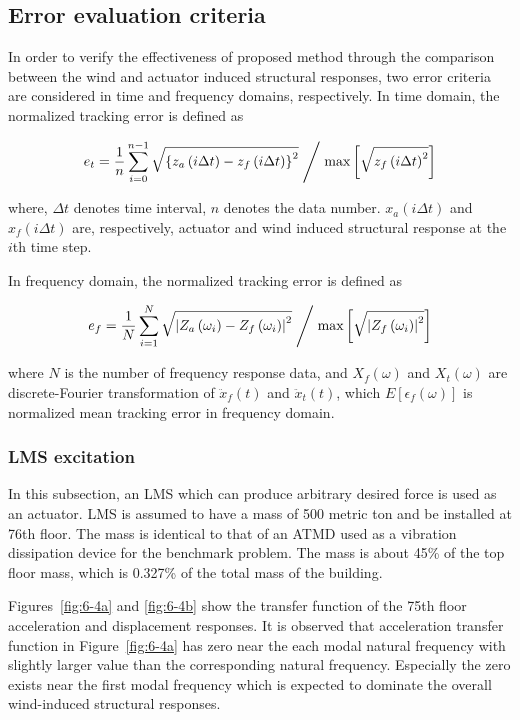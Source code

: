 \subsection{Error evaluation criteria}
In order to verify the effectiveness of proposed method through the comparison between the wind and actuator induced structural responses, two error criteria are considered in time and frequency domains, respectively.
In time domain, the normalized tracking error is defined as 

\begin{equation}\label{eq:6-8}
e_{t} = \frac{1}{n}\sum_{i=0}^{n-1}\sqrt{\left\{ z_{a} \left(i\Delta t \right) -z_{f}\left(i\Delta t\right) \right\}^{2}}  \Biggm/ \text{max} \left[\sqrt{z_{f}\left(i\Delta t\right)^{2}} \right]
\end{equation}

where, $\Delta t$ denotes time interval, $n$ denotes the data number. $x_{a}\left(i\Delta t\right)$ and $x_{f}\left(i\Delta t\right)$ are, respectively, actuator and wind induced structural response at the $i$th time step.

In frequency domain, the normalized tracking error is defined as

\begin{equation}\label{eq:6-9}
e_{f} = \frac{1}{N}\sum_{i=1}^{N}\sqrt{\left| Z_{a} \left(\omega_{i} \right) -Z_{f}\left(\omega_{i}\right) \right|^{2}} \Biggm/ \text{max} \left[\sqrt{\left|Z_{f}\left(\omega_{i}\right)\right|^{2}} \right]
\end{equation}

where $N$ is the number of frequency response data, and $X_{f}(\omega)$ and $X_{t}(\omega)$ are discrete-Fourier transformation of $\ddot{x}_{f}(t)$ and $\ddot{x}_{t}(t)$, which $E\left[\epsilon_{f}(\omega)\right]$ is normalized mean tracking error in frequency domain.

\subsubsection{LMS excitation}
In this subsection, an LMS which can produce arbitrary desired force is used as an actuator. LMS is assumed to have a mass of 500 metric ton and be installed at 76th floor. The mass is identical to that of an ATMD used as a vibration dissipation device for the benchmark problem. The mass is about 45\% of the top floor mass, which is 0.327\% of the total mass of the building.

Figures~\ref{fig:6-4a} and \ref{fig:6-4b} show the transfer function of the 75th floor acceleration and displacement responses. It is observed that acceleration transfer function in Figure~\ref{fig:6-4a} has zero near the each modal natural frequency with slightly larger value than the corresponding natural frequency. Especially the zero exists near the first modal frequency which is expected to dominate the overall wind-induced structural responses.

